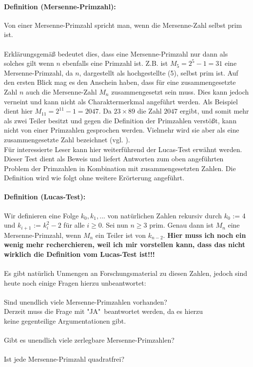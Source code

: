 \documentclass[german,12pt,a4paper]{article}
\begin{document}
\paragraph{Definition (Mersenne-Primzahl):}
Von einer Mersenne-Primzahl spricht man, wenn die Mersenne-Zahl selbst prim ist.\\
\\Erklärungsgemäß bedeutet dies, dass eine Mersenne-Primzahl nur dann als solches gilt wenn $n$ ebenfalls eine Primzahl ist.
Z.B. ist $M_5 = 2^{5}-1 = 31$ eine Mersenne-Primzahl, da $n$, dargestellt als hochgestellte (5), selbst prim ist.
Auf den ersten Blick mag es den Anschein haben, dass für eine zusammengesetzte Zahl $n$ auch die Mersenne-Zahl $M_n$ zusammengesetzt sein muss.
Dies kann jedoch verneint und kann nicht als Charaktermerkmal angeführt werden. Als Beispiel dient hier $M_{11} = 2^{11}-1 = 2047$.
Da $23 \times 89$ die Zahl $2047$ ergibt, und somit mehr als zwei Teiler besitzt und gegen die Definition der Primzahlen verstößt, kann nicht von einer Primzahlen gesprochen werden.
Vielmehr wird sie aber als eine zusammengesetzte Zahl bezeichnet (vgl. \cite[168--169]{RempeGillen2009}).\\
Für interessierte Leser kann hier weiterführend der Lucas-Test erwähnt werden.
Dieser Test dient als Beweis und liefert Antworten zum oben angeführten Problem der Primzahlen in Kombination mit zusammengesetzten Zahlen.
Die Definition wird wie folgt ohne weitere Erörterung angeführt.
\paragraph{Definition (Lucas-Test):}
Wir definieren eine Folge $k_0,k_1,...$ von natürlichen Zahlen rekursiv durch $k_0$ := 4 und $k_{i+1}$ := $k_i^2-2$ für alle $i\geq 0$.
\newline Sei nun $n\geq 3$ prim. Genau dann ist $M_n$ eine Mersenne-Primzahl, wenn $M_n$ ein Teiler ist von $k_{n-2}$.
\textbf{Hier muss ich noch ein wenig mehr recherchieren, weil ich mir vorstellen kann, dass das nicht wirklich die Definition vom Lucas-Test ist!!!}\\
\\Es gibt natürlich Unmengen an Forschungsmaterial zu diesen Zahlen, jedoch sind heute noch einige Fragen hierzu unbeantwortet:\\
\\Sind unendlich viele Mersenne-Primzahlen vorhanden?\\
\hspace*{15mm}Derzeit muss die Frage mit "JA"\ beantwortet werden, da es hierzu\\ 
\hspace*{15mm}keine gegenteilige Argumentationen gibt.\\
\\Gibt es unendlich viele zerlegbare Mersenne-Primzahlen?\\
\\Ist jede Mersenne-Primzahl quadratfrei?
\end{document}
